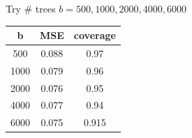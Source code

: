 \documentclass[]{article}
\begin{document}
Try \# trees \(b = 500, 1000, 2000, 4000, 6000\)

\begin{longtable}[]{@{}ccc@{}}
\toprule
\begin{minipage}[b]{0.09\columnwidth}\centering\strut
b\strut
\end{minipage} & \begin{minipage}[b]{0.10\columnwidth}\centering\strut
MSE\strut
\end{minipage} & \begin{minipage}[b]{0.13\columnwidth}\centering\strut
coverage\strut
\end{minipage}\tabularnewline
\midrule
\endhead
\begin{minipage}[t]{0.09\columnwidth}\centering\strut
500\strut
\end{minipage} & \begin{minipage}[t]{0.10\columnwidth}\centering\strut
0.088\strut
\end{minipage} & \begin{minipage}[t]{0.13\columnwidth}\centering\strut
0.97\strut
\end{minipage}\tabularnewline
\begin{minipage}[t]{0.09\columnwidth}\centering\strut
1000\strut
\end{minipage} & \begin{minipage}[t]{0.10\columnwidth}\centering\strut
0.079\strut
\end{minipage} & \begin{minipage}[t]{0.13\columnwidth}\centering\strut
0.96\strut
\end{minipage}\tabularnewline
\begin{minipage}[t]{0.09\columnwidth}\centering\strut
2000\strut
\end{minipage} & \begin{minipage}[t]{0.10\columnwidth}\centering\strut
0.076\strut
\end{minipage} & \begin{minipage}[t]{0.13\columnwidth}\centering\strut
0.95\strut
\end{minipage}\tabularnewline
\begin{minipage}[t]{0.09\columnwidth}\centering\strut
4000\strut
\end{minipage} & \begin{minipage}[t]{0.10\columnwidth}\centering\strut
0.077\strut
\end{minipage} & \begin{minipage}[t]{0.13\columnwidth}\centering\strut
0.94\strut
\end{minipage}\tabularnewline
\begin{minipage}[t]{0.09\columnwidth}\centering\strut
6000\strut
\end{minipage} & \begin{minipage}[t]{0.10\columnwidth}\centering\strut
0.075\strut
\end{minipage} & \begin{minipage}[t]{0.13\columnwidth}\centering\strut
0.915\strut
\end{minipage}\tabularnewline
\bottomrule
\end{longtable}
\end{document}
